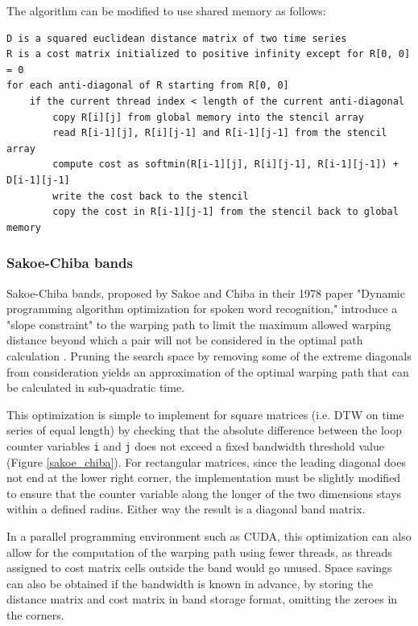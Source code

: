 \documentclass[12pt, letterpaper]{article}
\begin{document}
\FloatBarrier
The algorithm can be modified to use shared memory as follows:

\begin{verbatim}
D is a squared euclidean distance matrix of two time series
R is a cost matrix initialized to positive infinity except for R[0, 0] = 0
for each anti-diagonal of R starting from R[0, 0]
    if the current thread index < length of the current anti-diagonal
        copy R[i][j] from global memory into the stencil array
        read R[i-1][j], R[i][j-1] and R[i-1][j-1] from the stencil array
        compute cost as softmin(R[i-1][j], R[i][j-1], R[i-1][j-1]) + D[i-1][j-1]
        write the cost back to the stencil
        copy the cost in R[i-1][j-1] from the stencil back to global memory
\end{verbatim}
\FloatBarrier

\subsubsection{Sakoe-Chiba bands}

Sakoe-Chiba bands, proposed by Sakoe and Chiba in their 1978 paper "Dynamic
programming algorithm optimization for spoken word recognition," introduce a
"slope constraint" to the warping path to limit the maximum allowed warping
distance beyond which a pair will not be considered in the optimal path
calculation \cite{sakoe_dynamic_1978}. Pruning the search space by removing some
of the extreme diagonals from consideration yields an approximation of the
optimal warping path that can be calculated in sub-quadratic time.

This optimization is simple to implement for square matrices (i.e. DTW on time
series of equal length) by checking that the absolute difference between the
loop counter variables \verb|i| and \verb|j| does not exceed a fixed bandwidth
threshold value (Figure \ref{sakoe_chiba}). For rectangular matrices, since the
leading diagonal does not end at the lower right corner, the implementation must
be slightly modified to ensure that the counter variable along the longer of the
two dimensions stays within a defined radius. Either way the result is a
diagonal band matrix.

In a parallel programming environment such as CUDA, this optimization can also
allow for the computation of the warping path using fewer threads, as threads
assigned to cost matrix cells outside the band would go unused. Space savings
can also be obtained if the bandwidth is known in advance, by storing the
distance matrix and cost matrix in band storage format, omitting the zeroes
in the corners.
\end{document}
